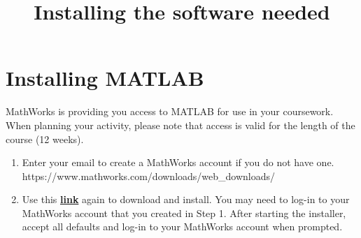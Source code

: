 \documentclass[11pt]{article}
\title{Installing the software needed}
\providecommand{\tightlist}{%
      \setlength{\itemsep}{0pt}\setlength{\parskip}{0pt}}
\begin{document}
    
    
    \maketitle
    
    
\tableofcontents
    
%
%
%

\section{Installing MATLAB}\label{installing-matlab}

MathWorks is providing you access to MATLAB for use in your coursework.
When planning your activity, please note that access is valid for the
length of the course (12 weeks).

\begin{enumerate}
\def\labelenumi{\arabic{enumi}.}
\item
  Enter your email to create a MathWorks account if you do not have one.
  https://www.mathworks.com/downloads/web\_downloads/
\item
  Use this
  \textbf{\href{https://www.mathworks.com/downloads/web_downloads/}{link}}
  again to download and install. You may need to log-in to your
  MathWorks account that you created in Step 1. After starting the
  installer, accept all defaults and log-in to your MathWorks account
  when prompted.
\end{enumerate}
\end{document}

